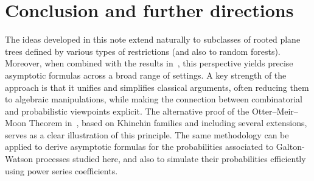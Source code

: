 \documentclass[11pt,a4paper,leqno]{amsart}
\theoremstyle{plain}
\newtheorem{theo}{Theorem}[section]
\theoremstyle{definition}
\numberwithin{equation}{section}
\def\P{\mathbf{P}}
\begin{document}
	
	\section{Conclusion and further directions}
	The ideas developed in this note extend naturally to subclasses of rooted plane trees defined by various types of restrictions (and also to random forests). Moreover, when combined with the results in~\cite{K_dos}, this perspective yields precise asymptotic formulas across a broad range of settings. A key strength of the approach is that it unifies and simplifies classical arguments, often reducing them to algebraic manipulations, while making the connection between combinatorial and probabilistic viewpoints explicit. The alternative proof of the Otter–Meir–Moon Theorem in~\cite{K_dos}, based on Khinchin families and including several extensions, serves as a clear illustration of this principle. The same methodology can be applied to derive asymptotic formulas for the probabilities associated to Galton-Watson processes studied here, and also to simulate their probabilities efficiently using power series coefficients.
	\smallskip
	
\end{document}
